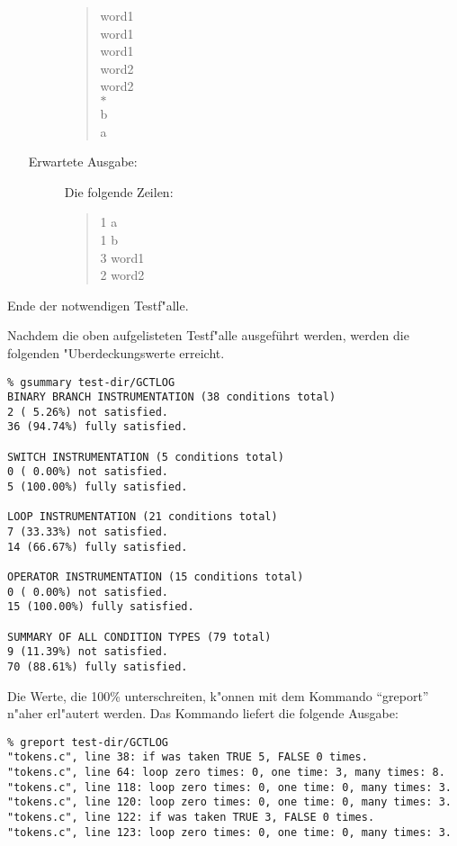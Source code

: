 \begin{enumerate}
\begin{description}
	\begin{quote}
	word1\\
	word1\\
	word1\\
	word2\\
	word2\\
	$*$\\
	b\\
	a
	\end{quote}

\item[Erwartete Ausgabe:] Die folgende Zeilen:

	\begin{quote}
	1 a\\
	1 b\\
	3 word1\\
	2 word2
	\end{quote}
\end{description}
\end{enumerate}
Ende der notwendigen Testf"alle.

\newpage

Nachdem die oben aufgelisteten Testf"alle ausgef\"uhrt werden,
werden die folgenden "Uberdeckungswerte erreicht.

{\small
\begin{verbatim}
% gsummary test-dir/GCTLOG 
BINARY BRANCH INSTRUMENTATION (38 conditions total)
2 ( 5.26%) not satisfied.
36 (94.74%) fully satisfied.

SWITCH INSTRUMENTATION (5 conditions total)
0 ( 0.00%) not satisfied.
5 (100.00%) fully satisfied.

LOOP INSTRUMENTATION (21 conditions total)
7 (33.33%) not satisfied.
14 (66.67%) fully satisfied.

OPERATOR INSTRUMENTATION (15 conditions total)
0 ( 0.00%) not satisfied.
15 (100.00%) fully satisfied.

SUMMARY OF ALL CONDITION TYPES (79 total)
9 (11.39%) not satisfied.
70 (88.61%) fully satisfied.
\end{verbatim}
}

\noindent
Die Werte, die 100\%  unterschreiten, k"onnen mit dem Kommando 
``greport'' n"aher erl"autert werden.  Das Kommando liefert die
folgende Ausgabe:
{\small
\begin{verbatim}
% greport test-dir/GCTLOG 
"tokens.c", line 38: if was taken TRUE 5, FALSE 0 times.
"tokens.c", line 64: loop zero times: 0, one time: 3, many times: 8.
"tokens.c", line 118: loop zero times: 0, one time: 0, many times: 3.
"tokens.c", line 120: loop zero times: 0, one time: 0, many times: 3.
"tokens.c", line 122: if was taken TRUE 3, FALSE 0 times.
"tokens.c", line 123: loop zero times: 0, one time: 0, many times: 3.
\end{verbatim}
}

